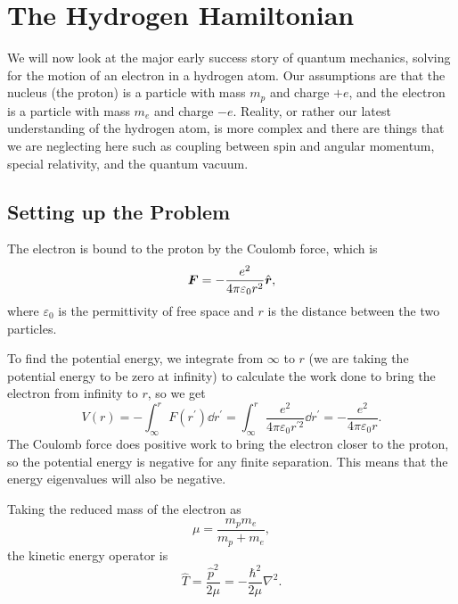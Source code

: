 \documentclass[../quantum_mechanics.tex]{subfiles}
\begin{document}
    \section{The Hydrogen Hamiltonian}\label{sec:hydrogen-hamiltonian}
        We will now look at the major early success story of quantum mechanics, solving for the motion of an electron in a hydrogen atom.
        Our assumptions are that the nucleus (the proton) is a particle with mass $m_p$ and charge $+e$, and the electron is a particle with mass $m_e$ and charge $-e$.
        Reality, or rather our latest understanding of the hydrogen atom, is more complex and there are things that we are neglecting here such as coupling between spin and angular momentum, special relativity, and the quantum vacuum.

        \subsection{Setting up the Problem}\label{sec:hydrogen-hamiltonian:subsec:setting-up-the-problem}
            The electron is bound to the proton by the Coulomb force, which is
            \begin{equation}
                \boldsymbol{F}=-\frac{e^2}{4\pi\varepsilon_0 r^2}\hat{\boldsymbol{r}},
            \end{equation}
            where $\varepsilon_0$ is the permittivity of free space and $r$ is the distance between the two particles.
            
            To find the potential energy, we integrate from $\infty$ to $r$ (we are taking the potential energy to be zero at infinity) to calculate the work done to bring the electron from infinity to $r$, so we get
            \begin{equation}
                V(r)=-\int_\infty^r F(r^\prime)\dd{r^\prime}=\int_\infty^r\frac{e^2}{4\pi\varepsilon_0 r^{\prime 2}}\dd{r^\prime}=-\frac{e^2}{4\pi\varepsilon_0 r}.
            \end{equation}
            The Coulomb force does positive work to bring the electron closer to the proton, so the potential energy is negative for any finite separation.
            This means that the energy eigenvalues will also be negative.

            Taking the reduced mass of the electron as
            \begin{equation}
                \mu=\frac{m_p m_e}{m_p + m_e},
            \end{equation}
            the kinetic energy operator is
            \begin{equation}
                \hat{T}=\frac{\hat{p}^2}{2\mu}=-\frac{\hbar^2}{2\mu}\nabla^2.
            \end{equation}
\end{document}
